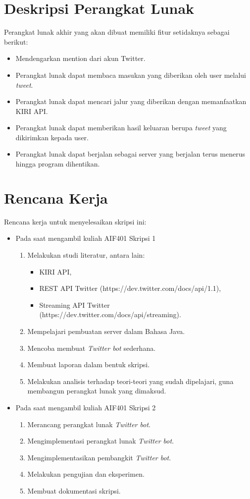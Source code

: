 \documentclass[a4paper,twoside]{article}
\begin{document}
\section{Deskripsi Perangkat Lunak}
Perangkat lunak akhir yang akan dibuat memiliki fitur setidaknya sebagai berikut:
\begin{itemize}
	\item Mendengarkan mention dari akun Twitter.
	\item Perangkat lunak dapat membaca masukan yang diberikan oleh user melalui \textit{tweet}.
	\item Perangkat lunak dapat mencari jalur yang diberikan dengan memanfaatkan KIRI API.
	\item Perangkat lunak dapat memberikan hasil keluaran berupa \textit{tweet} yang dikirimkan kepada user.
	\item Perangkat lunak dapat berjalan sebagai server yang berjalan terus menerus hingga program dihentikan.
\end{itemize}

\section{Rencana Kerja}
Rencana kerja untuk menyelesaikan skripsi ini:
\begin{itemize}
	\item Pada saat mengambil kuliah AIF401 Skripsi 1
	\begin{enumerate}
		\item Melakukan studi literatur, antara lain:
		\begin{itemize}
			\item KIRI API,
			\item REST API Twitter (https://dev.twitter.com/docs/api/1.1),
			\item Streaming API Twitter (https://dev.twitter.com/docs/api/streaming).
		\end{itemize}
		\item Mempelajari pembuatan server dalam Bahasa Java.
		\item Mencoba membuat \textit{Twitter bot} sederhana.
		\item Membuat laporan dalam bentuk skripsi.
		\item Melakukan analisis terhadap teori-teori yang sudah dipelajari, guna membangun perangkat lunak yang dimaksud.
	\end{enumerate}
	\item Pada saat mengambil kuliah AIF401 Skripsi 2
	\begin{enumerate}
		\item Merancang perangkat lunak \textit{Twitter bot}.
		\item Mengimplementasi perangkat lunak \textit{Twitter bot}.
		\item Mengimplementasikan pembangkit \textit{Twitter bot}. 
		\item Melakukan pengujian dan eksperimen.
		\item Membuat dokumentasi skripsi.
	\end{enumerate}
\end{itemize}
\end{document}
